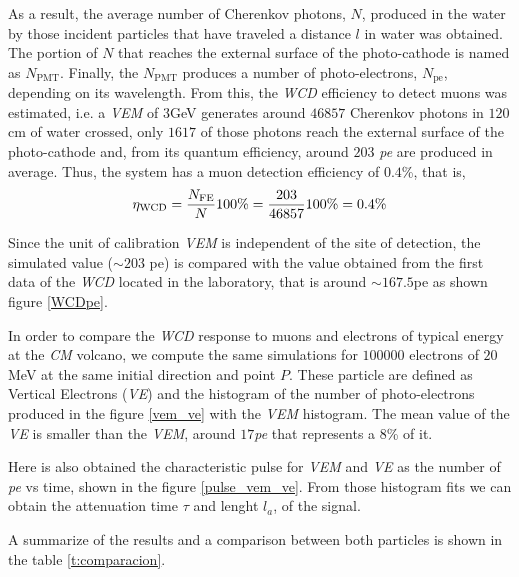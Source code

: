 \documentclass[submitting]{nst}
\begin{document}
As a result, the average number of Cherenkov photons, $N$, produced in the water by those incident particles that have traveled a distance $l$ in water was obtained. The portion of $N$ that reaches the external surface of the photo-cathode is named as $N_{\mathrm{PMT}}$. Finally, the $ N_{\mathrm{PMT}}$ produces a number of photo-electrons, $N_{\mathrm{pe}}$, depending on its wavelength. From this, the \textsl{WCD} efficiency to detect muons was estimated, i.e. a \textsl{VEM} of $3$GeV generates around $46857$ Cherenkov photons in $120$cm of water crossed, only $1617$ of those photons reach the external surface of the photo-cathode and, from its quantum efficiency, around $203$ \textsl{pe} are produced in average. Thus, the system has a muon detection efficiency of $0.4$\%, that is,
\begin{equation}
\eta_{\mathrm{WCD}}=\frac{N_{\mathrm{FE}}}{N} 100\%=\frac{203}{46857}100\%=0\textnormal{.}4\%
\end{equation}


Since the unit of calibration \textsl{VEM} is independent of the site of detection, the simulated value ($\sim 203$ pe) is compared with the value obtained from the first data of the \textsl{WCD} located in the laboratory, that is around $\sim 167.5$pe as shown figure \ref{WCDpe}. 

In order to compare the \textsl{WCD} response to muons and electrons of typical energy at the \textsl{CM} volcano, we compute the same simulations for $100000$ electrons of $20$MeV at the same initial direction and point $P$. These particle are defined as Vertical Electrons (\textsl{VE}) and the histogram of the number of photo-electrons produced in the figure \ref{vem_ve} with the \textsl{VEM} histogram. The mean value of the \textsl{VE} is smaller than the \textsl{VEM}, around $17$\textsl{pe} that represents a $8$\% of it.

Here is also obtained the characteristic pulse for \textsl{VEM} and \textsl{VE} as the number of \textsl{pe} vs time, shown in the figure \ref{pulse_vem_ve}. From those histogram fits we can obtain the attenuation time $\tau$ and lenght $l_a$, of the signal. 

A summarize of the results and a comparison between both particles is shown in the table \ref{t:comparacion}.
\end{document}
